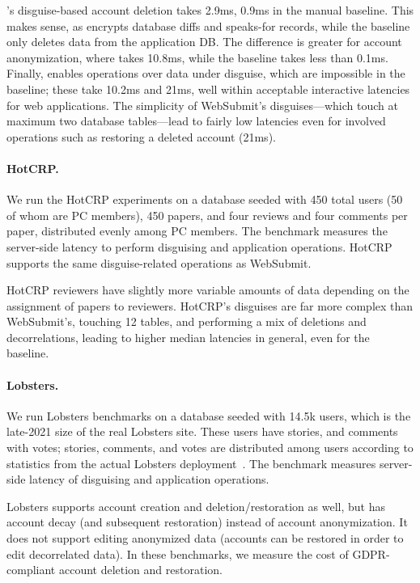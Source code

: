 %
\sys's disguise-based account deletion takes 2.9ms, \vs 0.9ms in the manual
baseline.
%
This makes sense, as \sys encrypts database diffs and speaks-for records, while
the baseline only deletes data from the application DB.
%
The difference is greater for account anonymization, where \sys takes 10.8ms,
while the baseline takes less than 0.1ms.
%
Finally, \sys enables operations over data under disguise, which are impossible in
the baseline; these take 10.2ms and 21ms, well within acceptable interactive
latencies for web applications.
%
The simplicity of WebSubmit's disguises---which touch at maximum two database
tables---lead to fairly low latencies even for involved operations such as
restoring a deleted account (21ms).
%

\paragraph{HotCRP.}
%
We run the HotCRP experiments on a database seeded with 450 total users (50 of
whom are PC members), 450 papers, and four reviews and four comments per paper,
distributed evenly among PC members.
%
The benchmark measures the server-side latency to perform disguising and
application operations.
%
HotCRP supports the same disguise-related operations as WebSubmit.
%

HotCRP reviewers have slightly more variable amounts of data  depending on the
assignment of papers to reviewers. HotCRP's disguises are far more complex than
WebSubmit's, touching 12 tables, and performing a mix of deletions and
decorrelations, leading to higher median latencies in general, even for the baseline.


\paragraph{Lobsters.}
%
We run Lobsters benchmarks on a database seeded with 14.5k users, which
is the late-2021 size of the real Lobsters site.
%
These users have  stories, and  comments with votes;
stories, comments, and votes are distributed among users according to
statistics from the actual Lobsters deployment~\cite{lobsters-data}.
%
The benchmark measures server-side latency of disguising and application
operations.
%

Lobsters supports account creation and deletion/restoration as well, but has account decay (and
subsequent restoration) instead of account anonymization.  It does not support editing anonymized
data (accounts can be restored in order to edit decorrelated data). In these benchmarks, we measure
the cost of GDPR-compliant account deletion and restoration.


